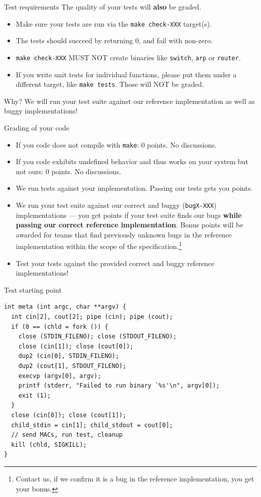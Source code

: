 \documentclass{beamer}
\begin{document}
\begin{frame}{Test requirements}
  The quality of your tests will {\bf also} be graded.
  \begin{itemize}
  \item Make sure your tests are run via the {\tt make check-XXX} target(s).
  \item The tests should succeed by returning 0, and fail with non-zero.
  \item {\tt make check-XXX} MUST NOT create binaries like {\tt switch}, {\tt arp}
    or {\tt router}.
  \item If you write unit tests for individual functions, please put them
    under a different target, like {\tt make tests}.  Those will NOT be
    graded.
  \end{itemize}
  Why? We will run your test suite against our reference implementation
  as well as buggy implementations!
\end{frame}


\begin{frame}{Grading of your code}
  \begin{itemize}
  \item If you code does not compile with {\tt make}: 0 points. No discussions.
  \item If you code exhibits undefined behavior and thus works on your system
        but not ours: 0 points. No discussions.
  \item We run tests against your
    implementation.  Passing our tests gets you points.
  \item We run your test suite against our correct and
    buggy ({\tt bugX-XXX}) implementations
    --- you get points if your test suite finds our bugs {\bf while passing our
      correct reference implementation}. Bonus points will be awarded for teams
    that find previously unknown bugs in the reference implementation within
    the scope of the specification.\footnote{Contact
      us, if we confirm it is a bug in the reference implementation,
      you get your bonus.}
  \item Test your tests against the provided correct and buggy reference
    implementations!
  \end{itemize}
\end{frame}


\begin{frame}[fragile]{Test starting point}
\begin{verbatim}
int meta (int argc, char **argv) {
  int cin[2], cout[2]; pipe (cin); pipe (cout);
  if (0 == (chld = fork ()) {
    close (STDIN_FILENO); close (STDOUT_FILENO);
    close (cin[1]); close (cout[0]);
    dup2 (cin[0], STDIN_FILENO);
    dup2 (cout[1], STDOUT_FILENO);
    execvp (argv[0], argv);
    printf (stderr, "Failed to run binary `%s'\n", argv[0]);
    exit (1);
  }
  close (cin[0]); close (cout[1]);
  child_stdin = cin[1]; child_stdout = cout[0];
  // send MACs, run test, cleanup
  kill (chld, SIGKILL);
}
\end{verbatim}

\end{frame}
\end{document}
